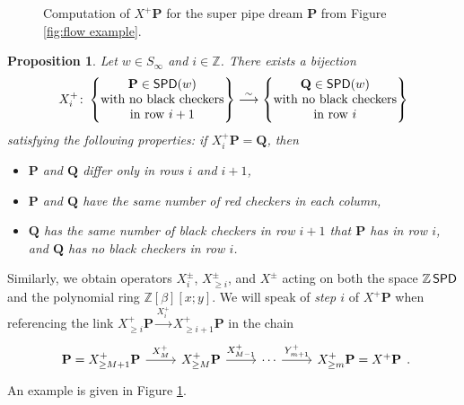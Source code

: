 \documentclass[11pt,reqno]{amsart} %
\makeatletter
\newcommand{\bbZ}{\mathbb{Z}}
\newcommand{\bfP}{\mathbf{P}}
\newcommand{\bfQ}{\mathbf{Q}}
\DeclareMathOperator{\SPD}{\sf{SPD}}
\newenvironment{shift}[1][(0,0)]{
    \begin{scope}[shift={#1}]
}{
    \end{scope}
}
\newtheorem{proposition}[theorem]{Proposition}
\theoremstyle{definition}
\newcommand{\drawSquare}[3][black,opacity=0.5]{
    \draw[#1,thin]
    (#2-0.5,#3+0.5) rectangle (#2+0.5,#3-0.5);
}
\newcommand{\drawGraySquare}[3][gray,opacity=0.3]{
    \filldraw[#1,thin]
    (#2-0.5,#3+0.5) rectangle (#2+0.5,#3-0.5);
}
\newcommand{\checkerradius}{0.38}
\newcommand{\drawXChecker}[2]{
    \fill[color=x color 2] (#1,#2) circle (\checkerradius);
    \fill[
        color=x color 1,
        pattern color=x color 1,
        pattern={Lines[distance=2pt]},
        thick
    ] (#1,#2) circle (\checkerradius);
    \draw[color=x color 1,thick] (#1,#2) circle (\checkerradius);
}
\newcommand{\drawYChecker}[2]{
    \fill[color=y color 2] (#1,#2) circle (\checkerradius);
    \fill[
        color=y color 1,
        pattern color=y color 1,
        pattern={Lines[distance=1.5pt,angle=90]},
    ] (#1,#2) circle (\checkerradius);
    \draw[color=y color 1, thick] (#1,#2) circle (\checkerradius);
}
\newcommand{\drawXYChecker}[2]{
    \drawXChecker{#1}{#2}
    \drawYChecker{#1-0.1}{#2+0.1}
}
\newcommand{\drawRCGraphTile}[3]{

    \ifnum #3=0 \fi %
    \ifnum #3=1 \drawXChecker{#1}{#2} \fi
    \ifnum #3=2 \drawYChecker{#1}{#2} \fi
    \ifnum #3=3 \drawXYChecker{#1}{#2} \fi
    \ifnum #3=4 \drawGraySquare{#1}{#2}\drawXChecker{#1}{#2} \fi
    \ifnum #3=5 \drawGraySquare{#1}{#2}\drawYChecker{#1}{#2} \fi
    \ifnum #3=6 \fi
    \ifnum #3=7 \fi
    \ifnum #3=8 \fi
    \ifnum #3=9 \drawGraySquare{#1}{#2} \fi
}
\newcommand{\drawRCGraph}[3]{
    \PD@i = 1
    \PD@j = 1
    \foreach \t in {#3}{
        \drawRCGraphTile{\number\PD@j}{-\number\PD@i}{\t}
        \drawSquare{\number\PD@j}{-\number\PD@i}
        
        \ifnum\PD@j < \numexpr#2\relax
            \global\advance\PD@j by 1
        \else
            \global\PD@j = 1
            \global\advance\PD@i by 1
        \fi
    }
}
\makeatother
\begin{document}
\begin{figure}

\caption{
    Computation of $X^+\bfP$ for the super pipe dream $\bfP$ from Figure \ref{fig:flow example}.
}
\label{fig:flow duality}
\end{figure}

\begin{proposition}
Let $w\in S_\infty$ and $i\in \bbZ$.
There exists a bijection \[
    X^+_i\colon 
    \left\{\begin{tabular}{@{} c @{}}
        $\bfP\in \SPD(w)$ \\
        with no black checkers \\
        in row $i+1$
    \end{tabular}\right\}
    \overset\sim\longrightarrow
    \left\{\begin{tabular}{@{} c @{}}
        $\bfQ\in \SPD(w)$ \\
        with no black checkers \\
        in row $i$
    \end{tabular}\right\}
\]
satisfying the following properties: if $X^+_i\bfP = \bfQ$, then
\begin{itemize}
    \item[(i)] $\bfP$ and $\bfQ$ differ only in rows $i$ and $i+1$,
    \item[(ii)] $\bfP$ and $\bfQ$ have the same number of red checkers in each column,
    \item[(iii)] $\bfQ$ has the same number of black checkers in row $i+1$ that $\bfP$ has in row $i$, and $\bfQ$ has no black checkers in row $i$.
\end{itemize}
\end{proposition}

Similarly, we obtain operators $X^\pm_i$, $X^\pm_{\geq i}$, and $X^\pm$ acting on both the space $\bbZ\SPD$ and the polynomial ring $\bbZ[\beta][x;y]$.
We will speak of \textit{step $i$} of $X^+\bfP$ when referencing the link $X^+_{\geq i}\bfP \overset{X^+_i}\longrightarrow X^+_{\geq i+1}\bfP$ in the chain \[
\begin{tikzcd}
    \bfP = X^+_{\geq M+1}\bfP \arrow[r, "X^+_M"]
    & X^+_{\geq M}\bfP \arrow[r,"X^+_{M-1}"]
    & \cdots \arrow[r,"Y^+_{m+1}"]
    & X^+_{\geq m} \bfP = X^+\bfP
\end{tikzcd}.
\]
An example is given in Figure \ref{fig:flow duality}.
\end{document}

